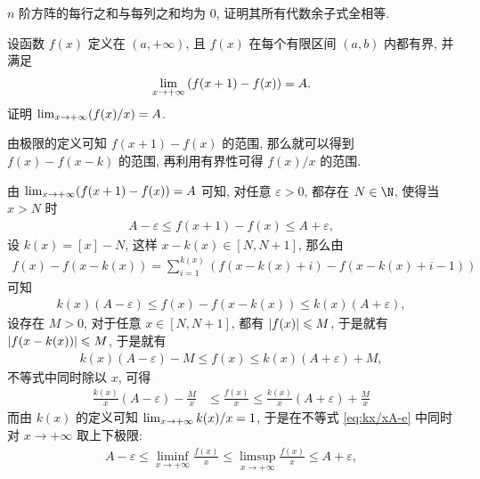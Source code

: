 \begin{exercise}[series=exer]
\begin{answer}
  \end{answer}
  \item $ n $ 阶方阵的每行之和与每列之和均为 0, 证明其所有代数余子式全相等.
  \item 设函数 $ f(x) $ 定义在 $ (a, +\infty) $, 且 $ f(x) $ 在每个有限区间 $ (a, b) $ 内都有界, 并满足
  \begin{align*}
      \lim_{x \to +\infty} \qty(f(x + 1) - f(x)) = A.
  \end{align*}
  证明 $ \lim_{x \to +\infty} (f(x) / x) = A $.
  \begin{hint}
      由极限的定义可知 $ f(x + 1) - f(x) $ 的范围, 那么就可以得到 $ f(x) - f(x - k) $ 的范围, 再利用有界性可得 $ f(x)/x $ 的范围.
  \end{hint}
  \begin{answer}
      由 $ \lim_{x \to +\infty} (f(x + 1) - f(x)) = A $ 可知, 对任意 $ \varepsilon > 0 $, 都存在 $ N \in \N $, 使得当 $ x > N $ 时
      \begin{align*}
          A - \varepsilon \le f(x + 1) - f(x) \le A + \varepsilon,
      \end{align*}
      设 $ k(x) = [x] - N $, 这样 $ x - k(x) \in [N, N + 1] $, 那么由
      \begin{align*}
          f(x) - f(x - k(x)) = \sum_{i = 1}^{k(x)}(f(x - k(x) + i) - f(x - k(x) + i - 1))
      \end{align*}
      可知
      \begin{align*}
          k(x)(A - \varepsilon) \le f(x) - f(x - k(x)) \le k(x)(A + \varepsilon),
      \end{align*}
      设存在 $ M > 0 $, 对于任意 $ x \in [N, N + 1] $, 都有 $ \abs{f(x)} \leqslant M $, 于是就有 $ \abs{f(x - k(x))} \leqslant M $, 于是就有
      \begin{align*}
          k(x)(A - \varepsilon) - M \le f(x) \le k(x)(A + \varepsilon) + M,
      \end{align*}
      不等式中同时除以 $ x $, 可得
      \begin{align}\label{eq:kx/xA-e}
          \frac{k(x)}{x}(A - \varepsilon) - \frac{M}{x} & \le \frac{f(x)}{x} \le \frac{k(x)}{x}(A + \varepsilon) + \frac{M}{x}
      \end{align}
      而由 $ k(x) $ 的定义可知 $ \lim_{x \to +\infty}k(x)/x = 1 $, 于是在不等式 \eqref{eq:kx/xA-e} 中同时对 $ x \to +\infty $ 取上下极限:
      \begin{align*}
          A - \varepsilon \le \liminf_{x \to +\infty} \frac{f(x)}{x} \le \limsup_{x \to +\infty} \frac{f(x)}{x} \le A + \varepsilon,
      \end{align*}

\end{answer}
\end{exercise}
